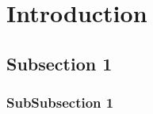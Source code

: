 \documentclass[a4paper, 11pt]{article} %
\begin{document}
\newpage %

\tableofcontents

\listoffigures

\listoftables

\printnomenclature

\pagebreak


\section{Introduction}
\lipsum[1] %

\subsection{Subsection 1}
\lipsum[1] %

\subsubsection{SubSubsection 1}
\lipsum[1] %



%

\end{document}
